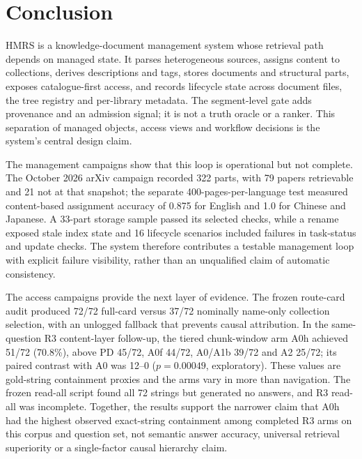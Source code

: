 \section{Conclusion}
\label{sec:conclusion}

HMRS is a knowledge-document management system whose retrieval path depends on
managed state. It parses heterogeneous sources, assigns content to collections,
derives descriptions and tags, stores documents and structural parts, exposes
catalogue-first access, and records lifecycle state across document files, the
tree registry and per-library metadata. The segment-level gate adds provenance
and an admission signal; it is not a truth oracle or a ranker. This separation
of managed objects, access views and workflow decisions is the system's central
design claim.

The management campaigns show that this loop is operational but not complete.
The October 2026 arXiv campaign recorded 322 parts, with 79 papers retrievable and
21 not at that snapshot; the separate 400-pages-per-language test measured content-based
assignment accuracy of 0.875 for English and 1.0 for Chinese and Japanese. A
33-part storage sample passed its selected checks, while a rename exposed stale
index state and 16 lifecycle scenarios included failures in task-status and
update checks. The system therefore contributes a testable management loop with
explicit failure visibility, rather than an unqualified claim of automatic
consistency.

The access campaigns provide the next layer of evidence. The frozen route-card
audit produced 72/72 full-card versus 37/72 nominally name-only collection
selection, with an unlogged fallback that prevents causal attribution. In the
same-question R3 content-layer follow-up, the tiered chunk-window arm A0h achieved
51/72 (70.8\%), above PD 45/72, A0f 44/72, A0/A1b 39/72 and A2 25/72; its paired
contrast with A0 was 12--0 ($p=0.00049$, exploratory). These values are
 gold-string containment proxies and the arms vary in more than navigation.
The frozen read-all script found all 72 strings but generated no answers, and
R3 read-all was incomplete. Together, the results support the narrower claim that A0h had the highest
observed exact-string containment among completed R3 arms on this corpus and
question set, not semantic answer accuracy, universal retrieval superiority or
a single-factor causal hierarchy claim.

